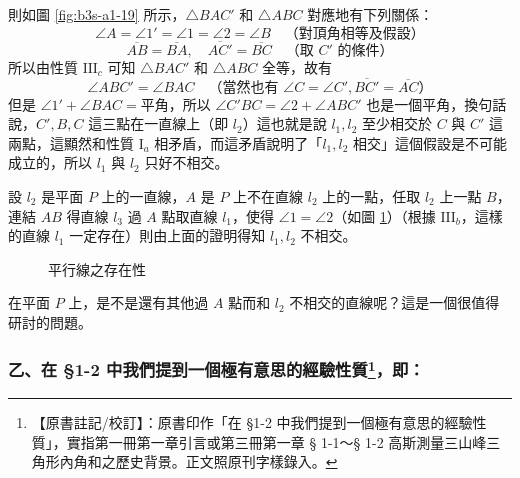 則如圖 \ref{fig:b3s-a1-19} 所示，$\triangle BAC'$ 和 $\triangle ABC$ 對應地有下列關係：
\[ \angle A = \angle 1' = \angle 1 = \angle 2 = \angle B \quad \text{（對頂角相等及假設）} \]
\[ \overline{AB} = \overline{BA}, \quad \overline{AC'} = \overline{BC} \quad \text{（取 $C'$ 的條件）} \]
所以由性質 $\mathrm{III}_c$ 可知 $\triangle BAC'$ 和 $\triangle ABC$ 全等，故有
\[ \angle ABC' = \angle BAC \quad \text{（當然也有 $\angle C = \angle C', \overline{BC'} = \overline{AC}$）} \]
但是 $\angle 1' + \angle BAC = \text{平角}$，所以 $\angle C'BC = \angle 2 + \angle ABC'$ 也是一個平角，換句話說，$C', B, C$ 這三點在一直線上（即 $l_2$）這也就是說 $l_1, l_2$ 至少相交於 $C$ 與 $C'$ 這兩點，這顯然和性質 $\mathrm{I}_a$ 相矛盾，而這矛盾說明了「$l_1, l_2$ 相交」這個假設是不可能成立的，所以 $l_1$ 與 $l_2$ 只好不相交。

設 $l_2$ 是平面 $P$ 上的一直線，$A$ 是 $P$ 上不在直線 $l_2$ 上的一點，任取 $l_2$ 上一點 $B$，連結 $AB$ 得直線 $l_3$ 過 $A$ 點取直線 $l_1$，使得 $\angle 1 = \angle 2$（如圖 \ref{fig:b3s-a1-20}）（根據 $\mathrm{III}_b$，這樣的直線 $l_1$ 一定存在）則由上面的證明得知 $l_1, l_2$ 不相交。

\begin{figure}[H]
\centering
{}
\caption{平行線之存在性}
\label{fig:b3s-a1-20}
\end{figure}

在平面 $P$ 上，是不是還有其他過 $A$ 點而和 $l_2$ 不相交的直線呢？這是一個很值得研討的問題。

\subsubsection*{乙、在 \S 1-2 中我們提到一個極有意思的經驗性質\label{note:b3s-a1-p273-sec}\footnote{【原書註記/校訂】：原書印作「在 \S 1-2 中我們提到一個極有意思的經驗性質」，實指第一冊第一章引言或第三冊第一章 § 1-1～§ 1-2 高斯測量三山峰三角形內角和之歷史背景。正文照原刊字樣錄入。}，即：}

